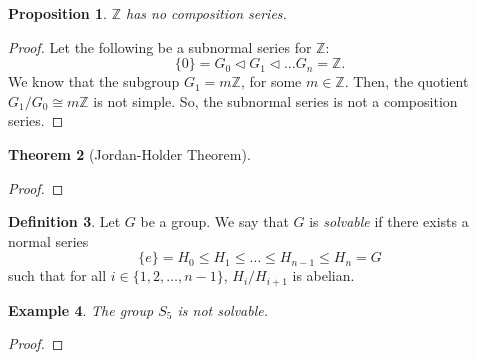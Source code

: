 \documentclass[a4paper, openany]{memoir}
\theoremstyle{definition}
\newtheorem{definition}{Definition}[section]
\theoremstyle{plain}
\newtheorem{theorem}[definition]{Theorem}
\newtheorem{proposition}[definition]{Proposition}
\newtheorem{example}[definition]{Example}
\begin{document}
    \begin{proposition}
        $\mathbb{Z}$ has no composition series.
    \end{proposition}
    \begin{proof}
        Let the following be a subnormal series for $\mathbb{Z}$:
        \[\{0\} = G_0 \vartriangleleft G_1 \vartriangleleft \dots G_n = \mathbb{Z}.\]
        We know that the subgroup $G_1 = m\mathbb{Z}$, for some $m \in \mathbb{Z}$. Then, the quotient $G_1/G_0 \cong m\mathbb{Z}$ is not simple. So, the subnormal series is not a composition series.
    \end{proof}

    \begin{theorem}[Jordan-Holder Theorem]
        
    \end{theorem}
    \begin{proof}
        
    \end{proof}

    \begin{definition}
        Let $G$ be a group. We say that $G$ is \emph{solvable} if there exists a normal series
        \[\{e\} = H_0 \leq H_1 \leq \dots \leq H_{n-1} \leq H_n = G\]
        such that for all $i \in \{1, 2, \dots, n-1\}$, $H_i/H_{i+1}$ is abelian.
    \end{definition}

    \begin{example}
        The group $S_5$ is not solvable.
    \end{example}
    \begin{proof}
        
    \end{proof}
\end{document}
